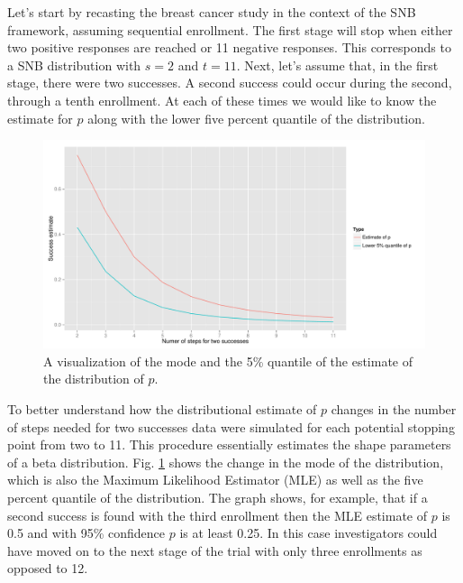 \documentclass[12pt]{article}         %
\begin{document}
Let's start by recasting the breast cancer study in the context of the SNB 
framework, assuming sequential enrollment. The first stage will stop when 
either two positive responses are reached or 11 negative responses. This 
corresponds to a SNB distribution with $s=2$ and $t=11$. Next, let's assume 
that, in the first stage, there were two successes. A second success could 
occur during the second, through a tenth enrollment. At each of these times we 
would like to know the estimate for $p$ along with the lower five percent 
quantile of the distribution.

\begin{figure}[ht]
\includegraphics[width=\textwidth]{uncertainty.pdf}
\caption{
A visualization of the mode and the 5\% quantile of the estimate of the distribution of $p$.
}
\label{fig:simon}
\end{figure}

To better understand how the distributional estimate of $p$ changes in the number of steps needed for two successes data were simulated for each potential stopping point from two to 11. This procedure essentially estimates the shape parameters of a beta distribution. Fig. \ref{fig:simon} shows the change in the mode of the distribution, which is also the Maximum Likelihood Estimator (MLE) as well as the five percent quantile of the distribution. The graph shows, for example, that if a second success is found with the third enrollment then the MLE estimate of $p$ is 0.5 and with 95\% confidence $p$ is at least 0.25. In this case investigators could have moved on to the next stage of the trial with only three enrollments as opposed to 12.
\end{document}
